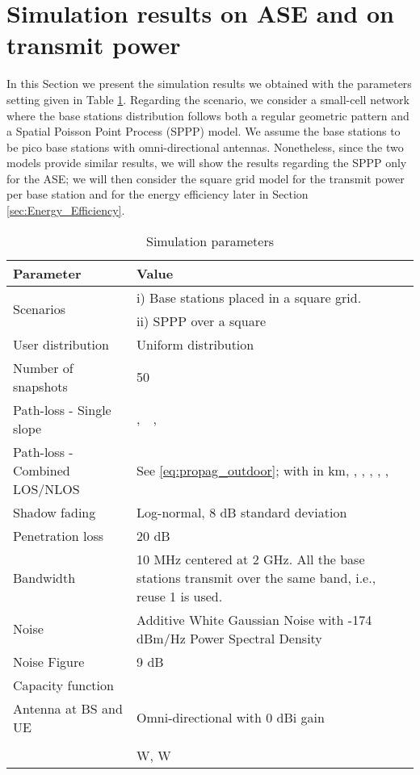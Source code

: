 \documentclass[twocoumn]{IEEEtran}
\begin{document}
\section{Simulation results on ASE and on transmit power} \label{sec:Simulation_Results_part_I}


In this Section we present the simulation results we obtained with
the parameters setting given in Table \ref{table:simulation-parameters}.
Regarding the scenario, we consider a small-cell network where the
base stations distribution follows both a regular geometric
pattern and a Spatial Poisson Point Process (SPPP) model. We assume the
base stations to be pico base stations with omni-directional antennas. Nonetheless, since the two models provide similar results, we will show the results regarding the SPPP only for the ASE; we will then consider the square grid model for the transmit power per base station and for the energy efficiency later in Section \ref{sec:Energy_Efficiency}.

\begin{table}[tbph]
\caption{Simulation parameters}
\label{table:simulation-parameters}
\centering \begin{tabular}{|p{2.55cm}|p{5.5cm}|}
\hline 
\textbf{Parameter}  & \textbf{Value}\tabularnewline
\hline 
\hline 
\multirow{2}{*}{Scenarios}  & i) Base stations placed in a 
square grid.\tabularnewline
\hline 
 & ii) SPPP over a  square\tabularnewline
\hline 
User distribution  & Uniform distribution \tabularnewline
\hline 
Number of snapshots  & 50\tabularnewline
\hline 
Path-loss - Single slope & \multirow{1}{5.5cm}{,~~, ~~  \cite{3GPP36814}}\tabularnewline
\hline 
Path-loss - Combined LOS/NLOS & See \eqref{eq:propag_outdoor}; with  in km, , ,
, , ,  \;\cite{3GPP36814}\tabularnewline
\hline 
Shadow fading  & Log-normal, 8 dB standard deviation \cite{3GPP36814}\tabularnewline
\hline 
Penetration loss  & 20 dB \cite{3GPP36814}\tabularnewline
\hline 
Bandwidth  & 10 MHz centered at 2 GHz. All the base stations transmit over the
same band, i.e., reuse 1 is used.\tabularnewline
\hline 
Noise  & Additive White Gaussian Noise with -174 dBm/Hz Power Spectral Density\tabularnewline
\hline 
Noise Figure  & 9 dB\tabularnewline
\hline 
Capacity function  & 
\cite{Harri2009}\tabularnewline
\hline 
Antenna at BS and UE  & Omni-directional with 0 dBi gain\tabularnewline
\hline 
 &  \cite{Auer2011}\tabularnewline
\hline 
 &  W,  W \cite{Auer2011}\tabularnewline
\hline 
\end{tabular}

\end{table}
\end{document}
